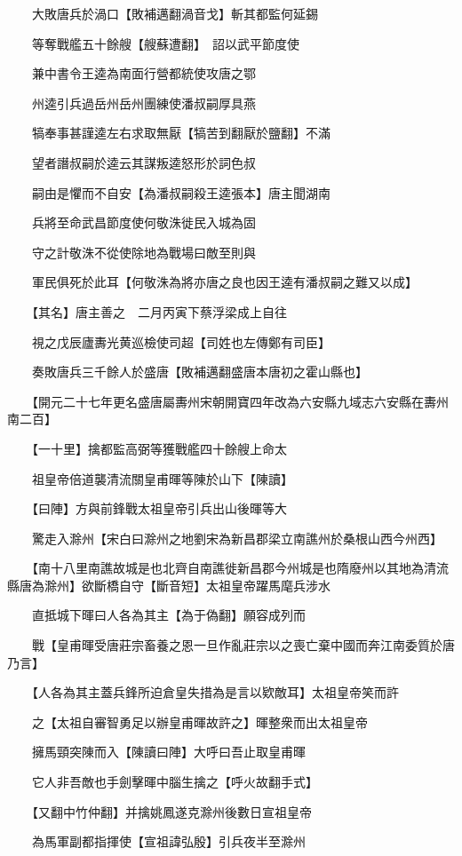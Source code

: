　　大敗唐兵於渦口【敗補邁翻渦音戈】斬其都監何延錫

　　等奪戰艦五十餘艘【艘蘇遭翻】　詔以武平節度使

　　兼中書令王逵為南面行營都統使攻唐之鄂

　　州逵引兵過岳州岳州團練使潘叔嗣厚具燕

　　犒奉事甚謹逵左右求取無厭【犒苦到翻厭於鹽翻】不滿

　　望者譖叔嗣於逵云其謀叛逵怒形於詞色叔

　　嗣由是懼而不自安【為潘叔嗣殺王逵張本】唐主聞湖南

　　兵將至命武昌節度使何敬洙徙民入城為固

　　守之計敬洙不從使除地為戰場曰敵至則與

　　軍民俱死於此耳【何敬洙為將亦唐之良也因王逵有潘叔嗣之難又以成】

　　【其名】唐主善之　二月丙寅下蔡浮梁成上自往

　　視之戊辰廬夀光黄巡檢使司超【司姓也左傳鄭有司臣】

　　奏敗唐兵三千餘人於盛唐【敗補邁翻盛唐本唐初之霍山縣也】

　　【開元二十七年更名盛唐屬夀州宋朝開寶四年改為六安縣九域志六安縣在夀州南二百】

　　【一十里】擒都監高弼等獲戰艦四十餘艘上命太

　　祖皇帝倍道襲清流關皇甫暉等陳於山下【陳讀】

　　【曰陣】方與前鋒戰太祖皇帝引兵出山後暉等大

　　驚走入滁州【宋白曰滁州之地劉宋為新昌郡梁立南譙州於桑根山西今州西】

　　【南十八里南譙故城是也北齊自南譙徙新昌郡今州城是也隋廢州以其地為清流縣唐為滁州】欲斷橋自守【斷音短】太祖皇帝躍馬麾兵涉水

　　直抵城下暉曰人各為其主【為于偽翻】願容成列而

　　戰【皇甫暉受唐莊宗畜養之恩一旦作亂莊宗以之喪亡棄中國而奔江南委質於唐乃言】

　　【人各為其主蓋兵鋒所迫倉皇失措為是言以欵敵耳】太祖皇帝笑而許

　　之【太祖自審智勇足以辦皇甫暉故許之】暉整衆而出太祖皇帝

　　擁馬頸突陳而入【陳讀曰陣】大呼曰吾止取皇甫暉

　　它人非吾敵也手劍擊暉中腦生擒之【呼火故翻手式】

　　【又翻中竹仲翻】并擒姚鳳遂克滁州後數日宣祖皇帝

　　為馬軍副都指揮使【宣祖諱弘殷】引兵夜半至滁州

